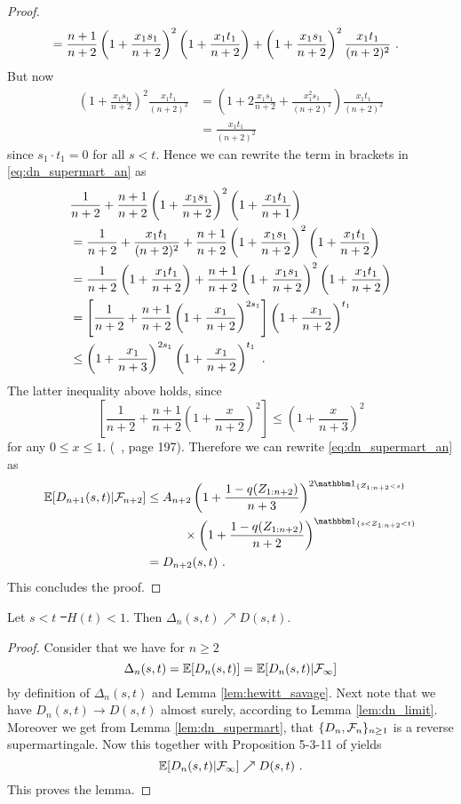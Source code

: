 \begin{lemma}
\begin{proof}
\begin{align*}
		&= \frac{n+1}{n+2}\left(1+\frac{x_1s_1}{n+2}\right)^{2}\left(1+\frac{x_1t_1}{n+2}\right) + \left(1+\frac{x_1s_1}{n+2}\right)^{2}\frac{x_1t_1}{(n+2)^2}\textrm{ .} 
		\end{align*}
		But now 
		\begin{align*}
		\left(1+\frac{x_1s_1}{n+2}\right)^{2}\frac{x_1t_1}{(n+2)^2} &= \left(1+2\frac{x_1s_1}{n+2}+\frac{x^2_1s_1}{(n+2)^2}\right)\frac{x_1t_1}{(n+2)^2}\\
		&= \frac{x_1t_1}{(n+2)^2}
		\end{align*}
		since $s_1\cdot t_1=0$ for all $s<t$. Hence we can rewrite the term in brackets in \eqref{eq:dn_supermart_an} as 
		\begin{align*}
		&\frac{1}{n+2} + \frac{n+1}{n+2}\left(1+\frac{x_1s_1}{n+2}\right)^{2} \left(1+\frac{x_1t_1}{n+1}\right) \\
		&=\frac{1}{n+2} + \frac{x_1t_1}{(n+2)^2} + \frac{n+1}{n+2}\left(1+\frac{x_1s_1}{n+2}\right)^{2}\left(1+\frac{x_1t_1}{n+2}\right)\\
		&=\frac{1}{n+2}\left(1+\frac{x_1t_1}{n+2}\right) + \frac{n+1}{n+2}\left(1+\frac{x_1s_1}{n+2}\right)^{2}\left(1+\frac{x_1t_1}{n+2}\right)\\
		&=\left[\frac{1}{n+2} + \frac{n+1}{n+2}\left(1+\frac{x_1}{n+2}\right)^{2s_1}\right]\left(1+\frac{x_1}{n+2}\right)^{t_1}\\
		&\leq \left(1+\frac{x_1}{n+3}\right)^{2s_1}\left(1+\frac{x_1}{n+2}\right)^{t_1}\textrm{ .} 
		\end{align*}
		The latter inequality above holds, since 
		$$\left[\frac{1}{n+2} + \frac{n+1}{n+2}\left(1+\frac{x}{n+2}\right)^{2}\right] \leq \left(1+\frac{x}{n+3}\right)^{2}$$
		for any $0\leq x\leq 1$. (\cf\ \cite{bose1999strong}, page 197). Therefore we can rewrite \eqref{eq:dn_supermart_an} as
		\begin{align*}
		\E[D_{n+1}(s,t)| \F_{n+2}]	&\leq A_{n+2} \left(1+\frac{1-q(Z_{1:n+2})}{n+3}\right)^{2\I{Z_{1:n+2}<s}} \\
		&\qquad\quad \times \left(1+\frac{1-q(Z_{1:n+2})}{n+2}\right)^{\I{s<Z_{1:n+2} <t}}\\
		&= D_{n+2}(s,t)\mdot
		\end{align*}		
		This concludes the proof.
	\end{proof}
\end{lemma}
%
\begin{lemma}Let $s<t$ \st\ $H(t)<1$. Then $\Delta_{n}(s,t) \nearrow D(s,t)$.
	\label{lem:neveu}
	\begin{proof}
		Consider that we have for $n\geq 2$
		$$\Delta_{n}(s,t) = \mathbb{E}[D_n(s,t)] = \mathbb{E}[D_n(s,t)|\mathcal{F}_\infty] $$
		by definition of $\Delta_{n}(s,t)$ and Lemma \ref{lem:hewitt_savage}. Next note that we have $D_n(s,t) \to D(s,t)$ almost surely, according to Lemma \ref{lem:dn_limit}. Moreover we get from Lemma \ref{lem:dn_supermart}, that $\{D_n,\mathcal{F}_n\}_{n\geq 1}$ is a reverse supermartingale. Now this together with Proposition 5-3-11 of \cite{neveu1975discrete} yields
		$$\mathbb{E}[D_n(s,t)|\mathcal{F}_\infty] \nearrow D(s,t)\textrm{ .}$$
		This proves the lemma.
	\end{proof}
\end{lemma}
